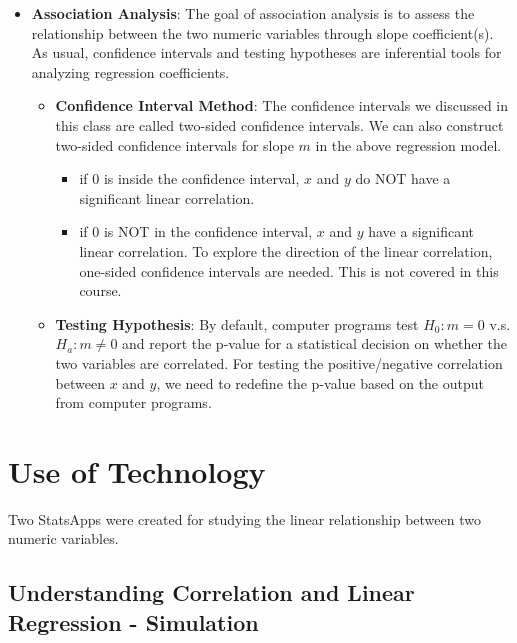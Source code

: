\documentclass[
]{book}
\providecommand{\tightlist}{%
  \setlength{\itemsep}{0pt}\setlength{\parskip}{0pt}}
\begin{document}
\begin{itemize}
\item
  \textbf{Association Analysis}: The goal of association analysis is to assess the relationship between the two numeric variables through slope coefficient(s). As usual, confidence intervals and testing hypotheses are inferential tools for analyzing regression coefficients.

  \begin{itemize}
  \tightlist
  \item
    \textbf{Confidence Interval Method}: The confidence intervals we discussed in this class are called two-sided confidence intervals. We can also construct two-sided confidence intervals for slope \(m\) in the above regression model.

    \begin{itemize}
    \tightlist
    \item
      if \(0\) is inside the confidence interval, \(x\) and \(y\) do NOT have a significant linear correlation.
    \item
      if \(0\) is NOT in the confidence interval, \(x\) and \(y\) have a significant linear correlation. To explore the direction of the linear correlation, one-sided confidence intervals are needed. This is not covered in this course.
    \end{itemize}
  \item
    \textbf{Testing Hypothesis}: By default, computer programs test \(H_0: m = 0\) v.s. \(H_a: m \ne 0\) and report the p-value for a statistical decision on whether the two variables are correlated. For testing the positive/negative correlation between \(x\) and \(y\), we need to redefine the p-value based on the output from computer programs.
  \end{itemize}
\end{itemize}

\hfill\break

\hypertarget{use-of-technology-10}{%
\section{Use of Technology}\label{use-of-technology-10}}

Two StatsApps were created for studying the linear relationship between two numeric variables.

\hypertarget{understanding-correlation-and-linear-regression---simulation}{%
\subsection{Understanding Correlation and Linear Regression - Simulation}\label{understanding-correlation-and-linear-regression---simulation}}
\end{document}
